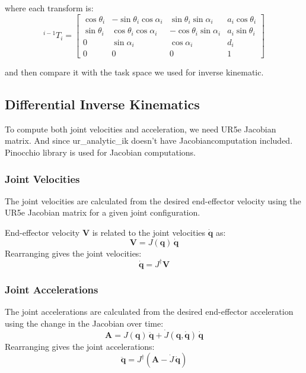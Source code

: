 where each transform is:
\[
{}^{i-1}\!T_i =
\begin{bmatrix}
\cos\theta_i & -\sin\theta_i\cos\alpha_i & \sin\theta_i\sin\alpha_i & a_i\cos\theta_i \\
\sin\theta_i & \cos\theta_i\cos\alpha_i  & -\cos\theta_i\sin\alpha_i & a_i\sin\theta_i \\
0            & \sin\alpha_i              & \cos\alpha_i              & d_i \\
0            & 0                          & 0                         & 1
\end{bmatrix}
\]

and then compare it with the task space we used for inverse kinematic.

\subsection{Differential Inverse Kinematics}
To compute both joint velocities and acceleration, we need UR5e Jacobian matrix. And since ur\_analytic\_ik doesn't have Jacobiancomputation included. Pinocchio library is used for Jacobian computations.

\subsubsection{Joint Velocities}
The joint velocities are calculated from the desired end-effector velocity using the UR5e Jacobian matrix for a given joint configuration.

End-effector velocity $\mathbf{V}$ is related to the joint velocities $\dot{\mathbf{q}}$ as:
\[
\mathbf{V} = J(\mathbf{q}) \, \dot{\mathbf{q}}
\]
Rearranging gives the joint velocities:
\[
\dot{\mathbf{q}} = J^\dagger \mathbf{V}
\]

\subsubsection{Joint Accelerations}
The joint accelerations are calculated from the desired end-effector acceleration using the change in the Jacobian over time:
\[
\mathbf{A} = J(\mathbf{q}) \, \ddot{\mathbf{q}} + \dot{J}(\mathbf{q}, \dot{\mathbf{q}}) \, \dot{\mathbf{q}}
\]
Rearranging gives the joint accelerations:
\[
\ddot{\mathbf{q}} = J^\dagger \left( \mathbf{A} - \dot{J} \, \dot{\mathbf{q}} \right)
\]

\newpage